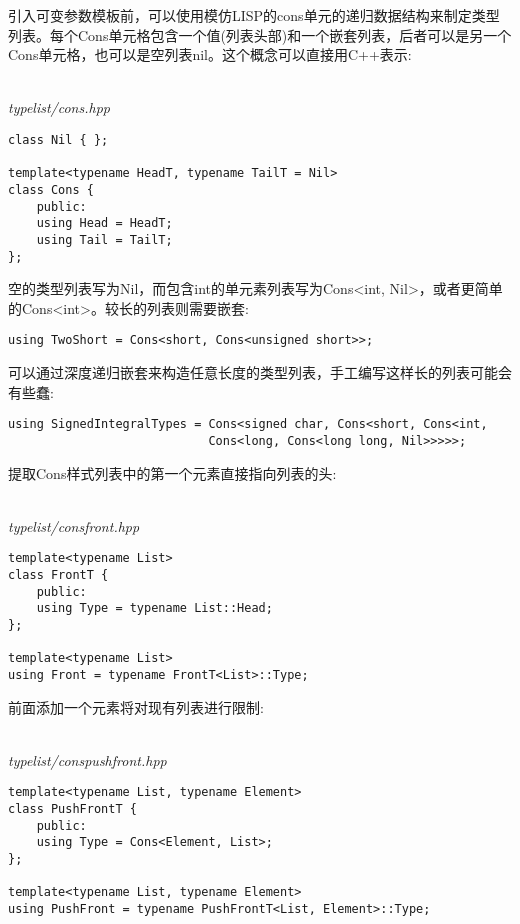 引入可变参数模板前，可以使用模仿LISP的cons单元的递归数据结构来制定类型列表。每个Cons单元格包含一个值(列表头部)和一个嵌套列表，后者可以是另一个Cons单元格，也可以是空列表nil。这个概念可以直接用C++表示:

\hspace*{\fill} \\ %
\noindent
\textit{typelist/cons.hpp}
\begin{lstlisting}[style=styleCXX]
class Nil { };

template<typename HeadT, typename TailT = Nil>
class Cons {
	public:
	using Head = HeadT;
	using Tail = TailT;
};
\end{lstlisting}

空的类型列表写为Nil，而包含int的单元素列表写为Cons<int, Nil>，或者更简单的Cons<int>。较长的列表则需要嵌套:

\begin{lstlisting}[style=styleCXX]
using TwoShort = Cons<short, Cons<unsigned short>>;
\end{lstlisting}

可以通过深度递归嵌套来构造任意长度的类型列表，手工编写这样长的列表可能会有些蠢:

\begin{lstlisting}[style=styleCXX]
using SignedIntegralTypes = Cons<signed char, Cons<short, Cons<int,
							Cons<long, Cons<long long, Nil>>>>>;
\end{lstlisting}

提取Cons样式列表中的第一个元素直接指向列表的头:

\hspace*{\fill} \\ %
\noindent
\textit{typelist/consfront.hpp}
\begin{lstlisting}[style=styleCXX]
template<typename List>
class FrontT {
	public:
	using Type = typename List::Head;
};

template<typename List>
using Front = typename FrontT<List>::Type;
\end{lstlisting}

前面添加一个元素将对现有列表进行限制:

\hspace*{\fill} \\ %
\noindent
\textit{typelist/conspushfront.hpp}
\begin{lstlisting}[style=styleCXX]
template<typename List, typename Element>
class PushFrontT {
	public:
	using Type = Cons<Element, List>;
};

template<typename List, typename Element>
using PushFront = typename PushFrontT<List, Element>::Type;
\end{lstlisting}

